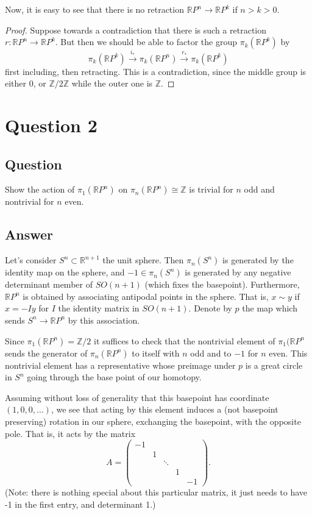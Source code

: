 \documentclass[11pt]{article}
\begin{document}
Now, it is easy to see that there is no  retraction $\mathbb{R}P^n \to \mathbb{R}P^k$ if $n>k>0$.
\begin{proof}
Suppose towards a contradiction that there is such a retraction $r: \mathbb{R}P^n \to \mathbb{R}P^k $.  But then we should be able to factor the group $\pi_k(\mathbb{R}P^k)$ by
\[\pi_k(\mathbb{R}P^k) \stackrel{i_*}{\to} \pi_k(\mathbb{R}P^n) \stackrel{r_*}{\to} \pi_k (\mathbb{R}P^k)\]
first including, then retracting. This is a contradiction, since the middle group is either 0, or $\mathbb{Z}/2\mathbb{Z}$ while the outer one is $\mathbb{Z}$.
\end{proof}

\section{Question 2}
\subsection{Question}
Show the action of $\pi_1(\mathbb{R}P^n)$ on $\pi_n(\mathbb{R}P^n) \cong \mathbb{Z}$ is trivial for $n$ odd and nontrivial for $n$ even.
\subsection{Answer}
Let's consider $S^n \subset \mathbb{R}^{n+1}$ the unit sphere.  Then  $\pi_n( S^n)$ is generated by the identity map on the sphere, and $-1 \in \pi_n( S^n)$ is generated by any negative determinant member of $SO(n+1)$ (which fixes the basepoint). Furthermore, $\mathbb{R}P^n$ is obtained by associating antipodal points in the sphere. That is, $x  \sim y$ if $x = -I y$ for $I$ the identity matrix in $SO(n+1)$. Denote by $p$ the map which sends $S^n \to \mathbb{R}P^n$ by this association. 

Since $\pi_1(\mathbb{R}P^n)=\mathbb{Z}/2$ it suffices to check that the nontrivial element of $\pi_1(\mathbb{R}P^n$ sends the generator of $\pi_n(\mathbb{R}P^n)$ to itself with $n$ odd and to $-1$ for $n$ even. This nontrivial element has a representative whose preimage under $p$ is a great circle in $S^n$ going through the base point of our homotopy.



Assuming without loss of generality that this basepoint has coordinate $(1,0,0,\dots)$, we see that acting by this element induces a (not basepoint preserving) rotation in our sphere, exchanging the basepoint, with the opposite pole. That is, it acts by the matrix
\[A = \left( \begin{array}{ccccc}-1\\ & 1 \\  &  & \ddots \\ &&&1\\ &&&&-1 \end{array} \right).\]
(Note: there is nothing special about this particular matrix, it just needs to have -1 in the first entry, and determinant 1.)
\end{document}
